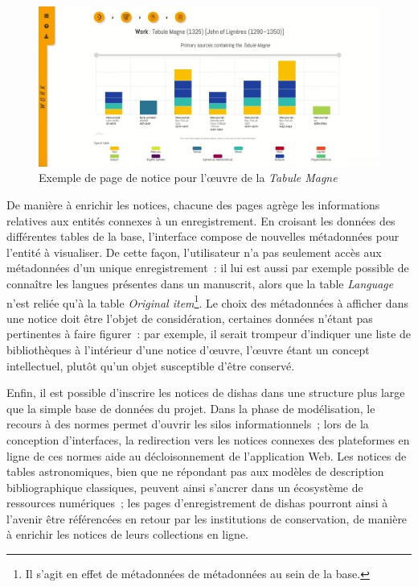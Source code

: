 \documentclass[a4paper,12pt,twoside]{book}
\newcommand{\eng}{\emph}
\newcommand{\Oi}{\eng{Original item}\xspace}
\newcommand{\bdd}{base de données\xspace}
\newcommand{\dishas}{\gls{dishas}\xspace}
\begin{document}
\begin{figure}[h!]
	\centering
	\includegraphics[width=15cm]{Images/Template-record-page.png}
	\caption{Exemple de page de notice pour l'œuvre de la \emph{Tabule Magne}}
\end{figure}

De manière à enrichir les notices, chacune des pages agrège les informations relatives aux entités connexes à un enregistrement. En croisant les données des différentes tables de la base, l'interface compose de nouvelles métadonnées pour l'entité à visualiser. De cette façon, l'utilisateur n'a pas seulement accès aux métadonnées d'un unique enregistrement~: il lui est aussi par exemple possible de connaître les langues présentes dans un manuscrit, alors que la table \eng{Language} n'est reliée qu'à la table \Oi\footnote{Il s'agit en effet de métadonnées de métadonnées au sein de la base.}. Le choix des métadonnées à afficher dans une notice doit être l'objet de considération, certaines données n'étant pas pertinentes à faire figurer~: par exemple, il serait trompeur d'indiquer une liste de bibliothèques à l'intérieur d'une notice d'œuvre, l'œuvre étant un concept intellectuel, plutôt qu'un objet susceptible d'être conservé.

Enfin, il est possible d'inscrire les notices de \dishas dans une structure plus large que la simple \bdd du projet. Dans la phase de modélisation, le recours à des normes permet d'ouvrir les silos informationnels~; lors de la conception d'interfaces, la redirection vers les notices connexes des plateformes en ligne de ces normes aide au décloisonnement de l'application Web. Les notices de tables astronomiques, bien que ne répondant pas aux modèles de description bibliographique classiques, peuvent ainsi s'ancrer dans un écosystème de ressources numériques~; les pages d'enregistrement de \dishas pourront ainsi à l'avenir être référencées en retour par les institutions de conservation, de manière à enrichir les notices de leurs collections en ligne.
\end{document}
